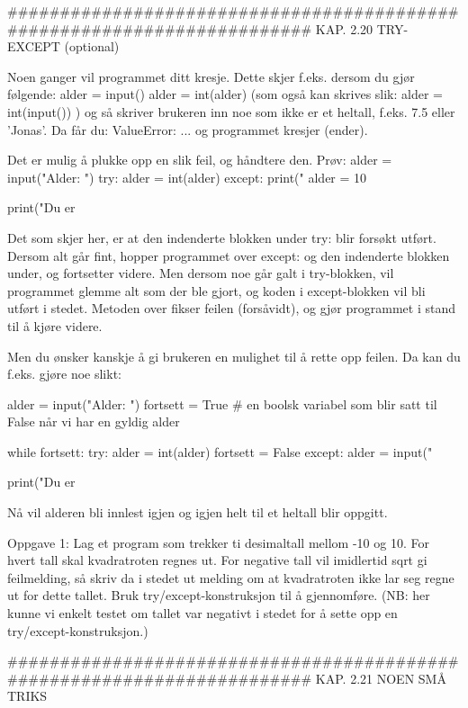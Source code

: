 ######################################################################## 
KAP. 2.20  TRY-EXCEPT (optional)

Noen ganger vil programmet ditt kresje.
Dette skjer f.eks. dersom du gjør følgende:
alder = input()
alder = int(alder)
(som også kan skrives slik: alder = int(input()) )
og så skriver brukeren inn noe som ikke er et heltall, f.eks. 7.5 eller 'Jonas'.
Da får du:
ValueError: ...
og programmet kresjer (ender). 

Det er mulig å plukke opp en slik feil, og håndtere den. 
Prøv: 
alder = input("Alder: ")
try:
    alder = int(alder)
except:
    print("%
    alder = 10 

print("Du er %
    
Det som skjer her, er at den indenderte blokken under try: blir forsøkt utført.
Dersom alt går fint, hopper programmet over except: og den indenderte blokken under, 
og fortsetter videre. 
Men dersom noe går galt i try-blokken, vil programmet glemme alt som der ble gjort, 
og koden i except-blokken vil bli utført i stedet. 
Metoden over fikser feilen (forsåvidt), og gjør programmet i stand til å kjøre videre. 

Men du ønsker kanskje å gi brukeren en mulighet til å rette opp feilen.
Da kan du f.eks. gjøre noe slikt:

alder = input("Alder: ")
fortsett = True     # en boolsk variabel som blir satt til False når vi har en gyldig alder

while fortsett: 
    try:
        alder = int(alder)
        fortsett = False
    except:
        alder = input("%

print("Du er %

Nå vil alderen bli innlest igjen og igjen helt til et heltall blir oppgitt. 


Oppgave 1: Lag et program som trekker ti desimaltall mellom -10 og 10.
For hvert tall skal kvadratroten regnes ut.
For negative tall vil imidlertid sqrt gi feilmelding, 
så skriv da i stedet ut melding om at kvadratroten ikke lar seg regne ut for dette tallet. 
Bruk try/except-konstruksjon til å gjennomføre.
(NB: her kunne vi enkelt testet om tallet var negativt i stedet for å sette opp en try/except-konstruksjon.) 

######################################################################## 
KAP. 2.21  NOEN SMÅ TRIKS

